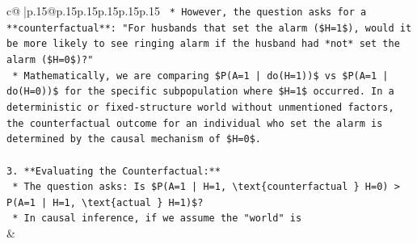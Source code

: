 \documentclass{article}
\begin{document}
{\begin{supertabular}{c@{$\;$}|p{.15\linewidth}@{}p{.15\linewidth}p{.15\linewidth}p{.15\linewidth}p{.15\linewidth}p{.15\linewidth}}
{{{\texttt{    *   However, the question asks for a **counterfactual**: "For husbands that set the alarm (\$H=1\$), would it be more likely to see ringing alarm if the husband had *not* set the alarm (\$H=0\$)?"} \\
\texttt{    *   Mathematically, we are comparing \$P(A=1 | do(H=1))\$ vs \$P(A=1 | do(H=0))\$ for the specific subpopulation where \$H=1\$ occurred. In a deterministic or fixed{-}structure world without unmentioned factors, the counterfactual outcome for an individual who set the alarm is determined by the causal mechanism of \$H=0\$.} \\
\\ 
\texttt{3.  **Evaluating the Counterfactual:**} \\
\texttt{    *   The question asks: Is \$P(A=1 | H=1, \textbackslash{}text\{counterfactual \} H=0) > P(A=1 | H=1, \textbackslash{}text\{actual \} H=1)\$?} \\
\texttt{    *   In causal inference, if we assume the "world" is} \\
            }
        }
    }
    & \\ \\


\end{supertabular}}
\end{document}
